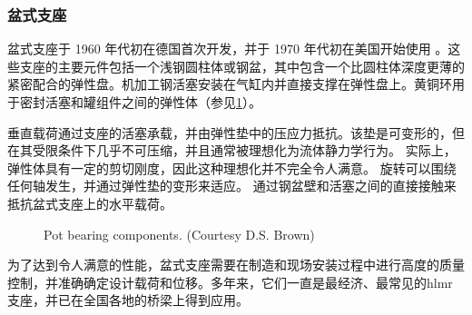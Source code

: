\subsubsection{盆式支座}
盆式支座于 1960 年代初在德国首次开发，并于 1970 年代初在美国开始使用 \cite{fyfe2006a}。这些支座的主要元件包括一个浅钢圆柱体或钢盆，其中包含一个比圆柱体深度更薄的紧密配合的弹性盘。机加工钢活塞安装在气缸内并直接支撑在弹性盘上。黄铜环用于密封活塞和罐组件之间的弹性体（参见\cref{fig:pot-bearing}）。

垂直载荷通过支座的活塞承载，并由弹性垫中的压应力抵抗。该垫是可变形的，但在其受限条件下几乎不可压缩，并且通常被理想化为流体静力学行为。 实际上，弹性体具有一定的剪切刚度，因此这种理想化并不完全令人满意。 旋转可以围绕任何轴发生，并通过弹性垫的变形来适应。 通过钢盆壁和活塞之间的直接接触来抵抗盆式支座上的水平载荷。

\begin{figure}
  \caption{Pot bearing components. (Courtesy D.S. Brown)}\label{fig:pot-bearing}
\end{figure}

为了达到令人满意的性能，盆式支座需要在制造和现场安装过程中进行高度的质量控制，并准确确定设计载荷和位移。多年来，它们一直是最经济、最常见的\acrlong*{hlmr}支座，并已在全国各地的桥梁上得到应用。



